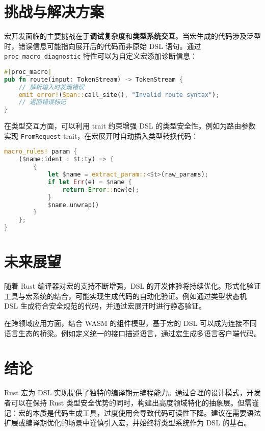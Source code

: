 \chapter{挑战与解决方案}
宏开发面临的主要挑战在于\textbf{调试复杂度}和\textbf{类型系统交互}。当宏生成的代码涉及泛型时，错误信息可能指向展开后的代码而非原始 DSL 语句。通过 \verb!proc_macro_diagnostic! 特性可以为自定义宏添加诊断信息：\par
\begin{lstlisting}[language=rust]
#[proc_macro]
pub fn route(input: TokenStream) -> TokenStream {
    // 解析输入时发现错误
    emit_error!(Span::call_site(), "Invalid route syntax");
    // 返回错误标记
}
\end{lstlisting}
在类型交互方面，可以利用 trait 约束增强 DSL 的类型安全性。例如为路由参数实现 \verb!FromRequest! trait，在宏展开时自动插入类型转换代码：\par
\begin{lstlisting}[language=rust]
macro_rules! param {
    ($name:ident : $t:ty) => {
        {
            let $name = extract_param::<$t>(raw_params);
            if let Err(e) = $name {
                return Error::new(e);
            }
            $name.unwrap()
        }
    };
}
\end{lstlisting}
\chapter{未来展望}
随着 Rust 编译器对宏的支持不断增强，DSL 的开发体验将持续优化。形式化验证工具与宏系统的结合，可能实现生成代码的自动化验证。例如通过类型状态机 DSL 生成符合安全规范的代码，并通过宏展开时进行静态验证。\par
在跨领域应用方面，结合 WASM 的组件模型，基于宏的 DSL 可以成为连接不同语言生态的桥梁。例如定义统一的接口描述语言，通过宏生成多语言客户端代码。\par
\chapter{结论}
Rust 宏为 DSL 实现提供了独特的编译期元编程能力。通过合理的设计模式，开发者可以在保持 Rust 类型安全优势的同时，构建出高度领域特化的抽象层。但需谨记：宏的本质是代码生成工具，过度使用会导致代码可读性下降。建议在需要语法扩展或编译期优化的场景中谨慎引入宏，并始终将类型系统作为 DSL 的基石。\par
